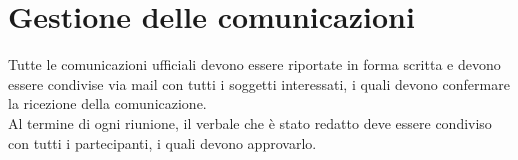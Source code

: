 \documentclass[a4paper,12pt]{article}
\begin{document}
\section{Gestione delle comunicazioni}
Tutte le comunicazioni ufficiali devono essere riportate in forma scritta e devono essere condivise via mail con tutti
i soggetti interessati, i quali devono confermare la ricezione della comunicazione.\\
Al termine di ogni riunione, il verbale che è stato redatto deve essere condiviso con tutti i partecipanti, i quali
devono approvarlo.
\end{document}
